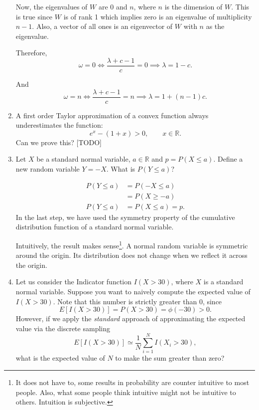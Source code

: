\documentclass{amsart}
\theoremstyle{plain}
\numberwithin{equation}{section}
\begin{document}
\begin{enumerate}
Now, the eigenvalues of $W$ are $0$ and $n$, where
$n$ is the dimension of $W$. This is true 
since $W$ is of rank 1 which implies zero is an 
eigenvalue of multiplicity $n-1$. Also, a vector of all ones 
is an eigenvector of $W$ with $n$ as the eigenvalue. 

Therefore, 
\begin{equation}
\omega = 0 \iff
\frac{\lambda + c - 1}{c} = 0
\implies \lambda = 1 - c.
\end{equation}

And
\begin{equation}
\omega = n \iff
\frac{\lambda + c - 1}{c} = n
\implies \lambda = 1 + (n-1)c.
\end{equation}


\item A first order Taylor approximation of a 
convex function always underestimates the
function:
\begin{equation}
e^{x} - ( 1 + x ) > 0, \qquad  x \in \mathbb{R}.
\end{equation}
Can we prove this? [TODO]

\item Let $X$ be a standard normal variable,
$a \in \mathbb{R}$ and $p = P( X \leq a )$.
Define a new random variable $Y = -X$. What is 
$P( Y \leq a )$?

\begin{align}
P( Y \leq a ) &= P( -X \leq a )\\
&= P( X \geq -a )\\
P( Y \leq a ) &= P( X \leq a ) = p.
\end{align}
In the last step, we have used the symmetry property of 
the cumulative distribution function of a standard normal 
variable. 

Intuitively, the result makes sense\footnote{It does not have to,
some results in probability are counter intuitive to most people. 
Also, what some people think intuitive might not be intuitive to 
others. Intuition is subjective.}. A normal 
random variable is symmetric around the origin. Its 
distribution does not change when we reflect it across the origin.

\item Let us consider the Indicator function $I(X>30)$, where
$X$ is a standard normal variable. 
Suppose you want to naively compute the expected value of 
$I(X>30)$. Note that this number is strictly greater than
$0$, since
\begin{equation*}
E[I(X>30)] = P(X>30) = \phi( -30 ) > 0.
\end{equation*}
However, if we apply the \emph{standard} approach 
of approximating the expected value via the 
discrete sampling
\begin{equation*}
E[I(X>30)] \simeq \frac{1}{N}\sum_{i=1}^{N} I(X_i>30), 
\end{equation*}
what is the expected value of $N$ to make the 
sum greater than zero?


\end{enumerate}
\end{document}
